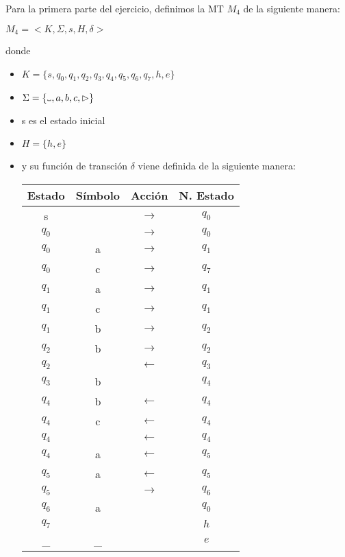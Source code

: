 \documentclass[11pt, a4paper, titlepage]{article}
\newcommand\vartextvisiblespace[1][.5em]{%
  \makebox[#1]{%
    \kern.07em
    \vrule height.3ex
    \hrulefill
    \vrule height.3ex
    \kern.07em
  }%
}
\begin{document}
Para la primera parte del ejercicio, definimos la MT $M_4$ de la siguiente
manera:

$ M_4 = < K, \Sigma, s, H, \delta >$

donde
\begin{itemize}
\item $ K = \{ s, q_0, q_1, q_2, q_3, q_4, q_5, q_6, q_7, h, e \}$
\item $ \Sigma = \{\vartextvisiblespace, a, b, c, \rhd \}$
\item s es el estado inicial
\item $ H = \{ h, e \}$
\item y su función de transción $\delta$ viene definida de la siguiente manera:
  \hfill \break
  \begin{center}
    \begin{tabular}{|| c c c c ||}
      \hline
      Estado & Símbolo & Acción & N. Estado \\ [0.5ex]
      \hline\hline
      s & \vartextvisiblespace & $\rightarrow$ & $q_0$ \\
      \hline
      $q_0$ & \vartextvisiblespace & $\rightarrow$ & $q_0$ \\
      \hline
      $q_0$ & a & $\rightarrow$ & $q_1$ \\
      \hline
      $q_0$ & c & $\rightarrow$ & $q_7$ \\
      \hline
      $q_1$ & a & $\rightarrow$ & $q_1$ \\
      \hline
      $q_1$ & c & $\rightarrow$ & $q_1$ \\
      \hline
      $q_1$ & b & $\rightarrow$ & $q_2$ \\
      \hline
      $q_2$ & b & $\rightarrow$ & $q_2$ \\
      \hline
      $q_2$ & \vartextvisiblespace & $\leftarrow$ & $q_3$ \\
      \hline
      $q_3$ & b & \vartextvisiblespace & $q_4$ \\
      \hline
      $q_4$ & b & $\leftarrow$ & $q_4$ \\
      \hline
      $q_4$ & c & $\leftarrow$ & $q_4$ \\
      \hline
      $q_4$ & \vartextvisiblespace & $\leftarrow$ & $q_4$ \\
      \hline
      $q_4$ & a & $\leftarrow$ & $q_5$ \\
      \hline
      $q_5$ & a & $\leftarrow$ & $q_5$ \\
      \hline
      $q_5$ & \vartextvisiblespace & $\rightarrow$ & $q_6$ \\
      \hline
      $q_6$ & a & \vartextvisiblespace & $q_0$ \\
      \hline
      $q_7$ & \vartextvisiblespace & \vartextvisiblespace & $h$ \\
      \hline
      \_ & \_ & \vartextvisiblespace & $e$ \\
      \hline
    \end{tabular}
  \end{center}
\end{itemize}
\end{document}
